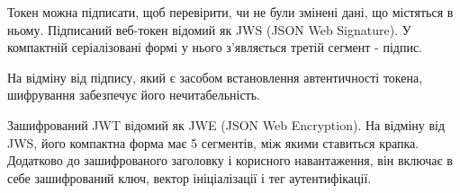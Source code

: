 Токен можна підписати, щоб перевірити, чи не були змінені дані, що містяться в ньому. Підписаний веб-токен відомий як JWS (JSON Web Signature). У компактній серіалізовані формі у нього з'являється третій сегмент - підпис.

На відміну від підпису, який є засобом встановлення автентичності токена, шифрування забезпечує його нечитабельність.

Зашифрований JWT відомий як JWE (JSON Web Encryption). На відміну від JWS, його компактна форма має 5 сегментів, між якими ставиться крапка. Додатково до зашифрованого заголовку і корисного навантаження, він включає в себе зашифрований ключ, вектор ініціалізації і тег аутентифікації.
